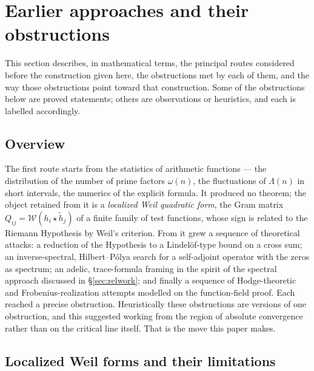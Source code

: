 \documentclass[11pt]{amsart}
\theoremstyle{definition}
\theoremstyle{remark}
\theoremstyle{definition}
\newcommand{\cW}{\mathcal{W}}
\begin{document}
\section{Earlier approaches and their obstructions}\label{sec:history}

This section describes, in mathematical terms, the principal routes considered before the construction
given here, the obstructions met by each of them, and the way those obstructions point toward that
construction. Some of the obstructions below are proved statements; others are observations or
heuristics, and each is labelled accordingly.

\subsection{Overview}\label{sec:journey}

The first route starts from the statistics of arithmetic functions --- the distribution of the
number of prime factors $\omega(n)$, the fluctuations of $\Lambda(n)$ in short intervals, the numerics of
the explicit formula. It produced no theorem; the object retained from it is a \emph{localized Weil
quadratic form}, the Gram matrix $Q_{ij}=\cW(h_i\star\tilde h_j)$ of a finite family of test functions,
whose sign is related to the Riemann Hypothesis by Weil's criterion. From it grew a sequence of theoretical attacks: a
reduction of the Hypothesis to a Lindel\"of-type bound on a cross sum; an inverse-spectral, Hilbert--P\'olya
search for a self-adjoint operator with the zeros as spectrum; an adelic, trace-formula framing in the
spirit of the spectral approach discussed in \S\ref{sec:relwork}; and finally a sequence of
Hodge-theoretic and Frobenius-realization attempts modelled on the function-field proof. Each reached a
precise obstruction. Heuristically these obstructions are versions of one obstruction, and this
suggested working from the region of absolute convergence rather than on the critical line itself.
That is the move this paper makes.

\subsection{Localized Weil forms and their limitations}\label{sec:empirical}
\end{document}

